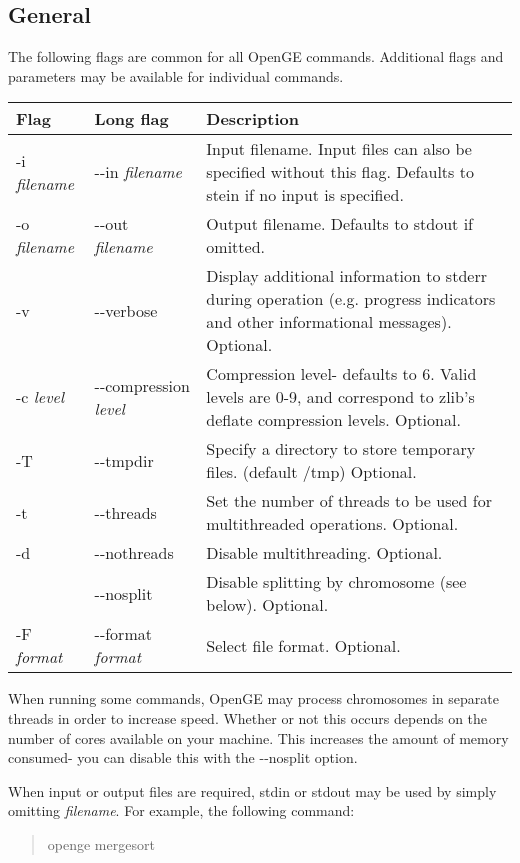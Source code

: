 \documentclass[11pt]{article}
\newcommand {\cmd}[1] {\begin{quote}#1\end{quote}}
\begin{document}
\subsection {General}
\label{general_options}
The following flags are common for all OpenGE commands. Additional flags and parameters may be available for individual commands.
\begin{center}
\begin{tabular}{llp{3.5in}}
\hline
Flag&Long flag&Description\\ \hline
-i \textit{filename}&{-}{-}in \textit{filename}&Input filename. Input files can also be specified without this flag. Defaults to stein if no input is specified.\\
-o \textit{filename}&{-}{-}out \textit{filename}&Output filename. Defaults to stdout if omitted. \\
-v&{-}{-}verbose&Display additional information to stderr during operation (e.g. progress indicators and other informational messages). Optional.\\
-c \textit{level}&{-}{-}compression \textit{level}&Compression level- defaults to 6. Valid levels are 0-9, and correspond to zlib's deflate compression levels. Optional.\\
-T&{-}{-}tmpdir&Specify a directory to store temporary files. (default /tmp) Optional.\\
-t&{-}{-}threads&Set the number of threads to be used for multithreaded operations. Optional.\\
-d&{-}{-}nothreads&Disable multithreading. Optional.\\
&{-}{-}nosplit&Disable splitting by chromosome (see below). Optional.\\
-F \textit{format}&{-}{-}format \textit{format}&Select file format. Optional.\\
\end{tabular}
\end{center}

When running some commands, OpenGE may process chromosomes in separate threads in order to increase speed. Whether or not this occurs depends on the number of cores available on your machine. This increases the amount of memory consumed- you can disable this with the {-}{-}nosplit option.

When input or output files are required, stdin or stdout may be used by simply omitting \textit{filename}. For example, the following command:

\cmd{openge mergesort}
\end{document}
